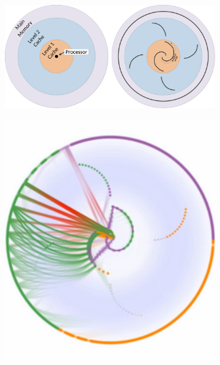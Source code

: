 \begin{figure}
	\begin{subfigure}[c]{.48\linewidth}
		\centering
		\includegraphics[width=\linewidth]{pictures/abstract_explanation.png}
	\end{subfigure}
	\begin{subfigure}[c]{.24\linewidth}
		\centering
		\includegraphics[width=\linewidth]{pictures/abstract_standard.png}
	\end{subfigure}
	\begin{subfigure}[c]{.24\linewidth}
		\centering

\end{subfigure}
\end{figure}
